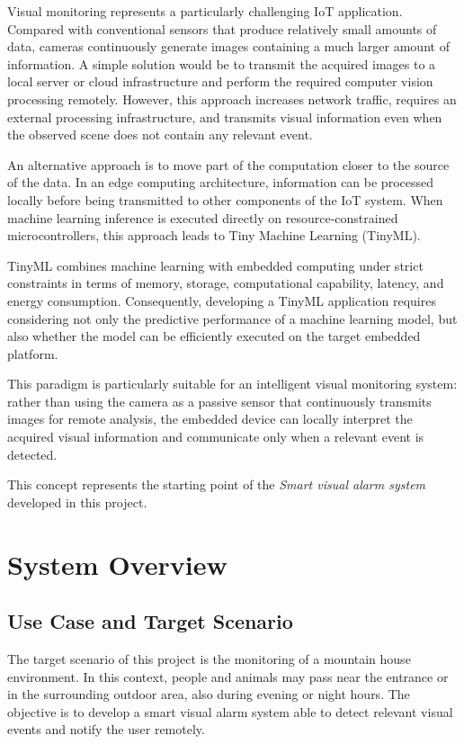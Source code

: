 \documentclass{article}
\begin{document}
Visual monitoring represents a particularly challenging IoT application.
Compared with conventional sensors that produce relatively small amounts
of data, cameras continuously generate images containing a much larger
amount of information. A simple solution would be to transmit the acquired
images to a local server or cloud infrastructure and perform the required
computer vision processing remotely. However, this approach increases
network traffic, requires an external processing infrastructure, and
transmits visual information even when the observed scene does not contain
any relevant event.

An alternative approach is to move part of the computation closer to the
source of the data. In an edge computing architecture, information can be
processed locally before being transmitted to other components of the IoT
system. When machine learning inference is executed directly on
resource-constrained microcontrollers, this approach leads to Tiny Machine
Learning (TinyML).

TinyML combines machine learning with embedded computing under strict
constraints in terms of memory, storage, computational capability, latency,
and energy consumption. Consequently, developing a TinyML application
requires considering not only the predictive performance of a machine
learning model, but also whether the model can be efficiently executed on
the target embedded platform.

This paradigm is particularly suitable for an intelligent visual monitoring
system: rather than using the camera as a passive sensor that continuously
transmits images for remote analysis, the embedded device can locally
interpret the acquired visual information and communicate only when a
relevant event is detected.

This concept represents the starting point of the \emph{Smart visual alarm
system} developed in this project.

\section{System Overview}

\subsection{Use Case and Target Scenario}

The target scenario of this project is the monitoring of a mountain house environment. In this context, people and animals may pass near the entrance or in the surrounding outdoor area, also during evening or night hours. The objective is to develop a smart visual alarm system able to detect relevant visual events and notify the user remotely.
\end{document}
